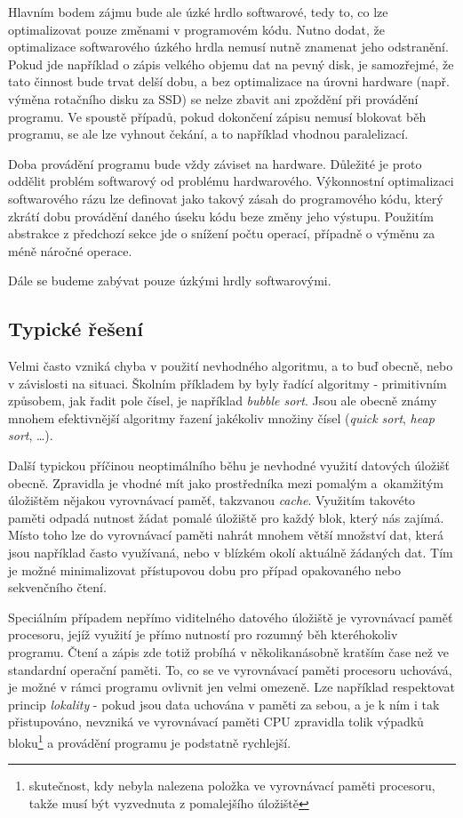 \documentclass[czech,BP]{thesiskiv}
\begin{document}
Hlavním bodem zájmu bude ale úzké hrdlo softwarové, tedy to, co lze optimalizovat pouze změnami v programovém kódu. Nutno dodat, že optimalizace softwarového úzkého hrdla nemusí nutně znamenat jeho odstranění. Pokud jde například o zápis velkého objemu dat na pevný disk, je samozřejmé, že tato činnost bude trvat delší dobu, a bez optimalizace na úrovni hardware (např. výměna rotačního disku za SSD) se nelze zbavit ani zpoždění při provádění programu. Ve spoustě případů, pokud dokončení zápisu nemusí blokovat běh programu, se ale lze vyhnout čekání, a to například vhodnou paralelizací.

Doba provádění programu bude vždy záviset na hardware. Důležité je proto oddělit problém softwarový od problému hardwarového. Výkonnostní optimalizaci softwarového rázu lze definovat jako takový zásah do programového kódu, který zkrátí dobu provádění daného úseku kódu beze změny jeho výstupu. Použitím abstrakce z předchozí sekce jde o snížení počtu operací, případně o výměnu za méně náročné operace.

Dále se budeme zabývat pouze úzkými hrdly softwarovými.

\subsection{Typické řešení}

Velmi často vzniká chyba v použití nevhodného algoritmu, a to buď obecně, nebo v závislosti na situaci. Školním příkladem by byly řadící algoritmy - primitivním způsobem, jak řadit pole čísel, je například \emph{bubble sort}. Jsou ale obecně známy mnohem efektivnější algoritmy řazení jakékoliv množiny čísel (\emph{quick sort}, \emph{heap sort}, \dots). 

Další typickou příčinou neoptimálního běhu je nevhodné využití datových úložišť obecně. Zpravidla je vhodné mít jako prostředníka mezi pomalým a~okamžitým úložištěm nějakou vyrovnávací paměť, takzvanou \emph{cache}. Využitím takovéto paměti odpadá nutnost žádat pomalé úložiště pro každý blok, který nás zajímá. Místo toho lze do vyrovnávací paměti nahrát mnohem větší množství dat, která jsou například často využívaná, nebo v blízkém okolí aktuálně žádaných dat. Tím je možné minimalizovat přístupovou dobu pro případ opakovaného nebo sekvenčního čtení.

Speciálním případem nepřímo viditelného datového úložiště je vyrovnávací paměť procesoru, jejíž využití je přímo nutností pro rozumný běh kteréhokoliv programu. Čtení a zápis zde totiž probíhá v několikanásobně kratším čase než ve standardní operační paměti. To, co se ve vyrovnávací paměti procesoru uchovává, je možné v rámci programu ovlivnit jen velmi omezeně. Lze například respektovat princip \emph{lokality} - pokud jsou data uchována v paměti za sebou, a je k ním i tak přistupováno, nevzniká ve vyrovnávací paměti CPU zpravidla tolik výpadků bloku\footnote{skutečnost, kdy nebyla nalezena položka ve vyrovnávací paměti procesoru, takže musí být vyzvednuta z pomalejšího úložiště} a provádění programu je podstatně rychlejší.
\end{document}
